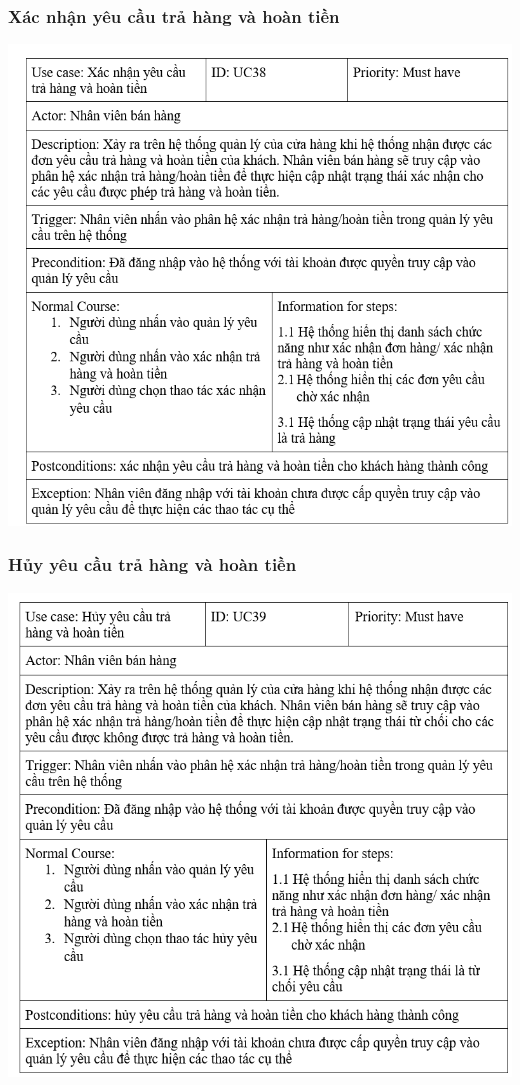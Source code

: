 \documentclass[12pt,a4paper,2sides]{report}
\begin{document}
\subsubsection{Xác nhận yêu cầu trả hàng và hoàn tiền}
    \includegraphics[width=1\linewidth]{lib/usecase/xacnhanyeucauth.png}\\\vspace*{1cm} 
\subsubsection{Hủy yêu cầu trả hàng và hoàn tiền}
    \includegraphics[width=1\linewidth]{lib/usecase/huyyeucauthvahoantien.png}\\\vspace*{1cm} 
\end{document}
